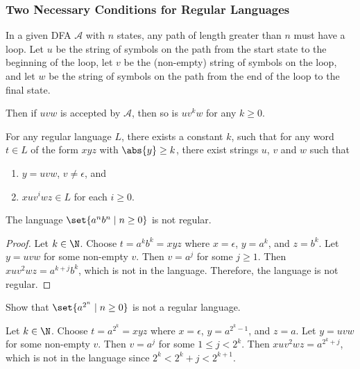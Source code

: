 
\subsubsection{Two Necessary Conditions for Regular Languages} \label{sec:pumping_periodic}
In a given DFA $\mathcal{A}$ with $n$ states, any path of length greater
than $n$ must have a loop.
Let $u$ be the string of symbols on the path from the start state to the
beginning of the loop, let $v$ be the (non-empty) string of symbols on the
loop, and let $w$ be the string of symbols on the path from the end of the
loop to the final state.

Then if $uvw$ is accepted by $\mathcal{A}$, then so is $uv^kw$ for any
$k \geq 0$.

\begin{theorem}
    For any regular language $L$, there exists a constant $k$, such that
    for any word $t \in L$ of the form $xyz$ with $\abs{y} \ge k$, there
    exist strings $u$, $v$ and $w$ such that
    \begin{enumerate}
        \item $y = uvw$, $v \ne \epsilon$, and
        \item $xu v^i wz \in L$ for each $i \ge 0$.
    \end{enumerate}
\end{theorem}

\begin{proposition}
    The language $\set{a^n b^n \mid n \ge 0}$ is not regular.
\end{proposition}
\begin{proof}
    Let $k \in \N$.
    Choose $t = a^k b^k = xyz$ where $x = \epsilon$, $y = a^k$, and $z = b^k$.
    Let $y = uvw$ for some non-empty $v$.
    Then $v = a^j$ for some $j \ge 1$.
    Then $x u v^2 w z = a^{k + j} b^k$, which is not in the language.
    Therefore, the language is not regular.
\end{proof}

\begin{problem}
    Show that $\set{a^{2^n} \mid n \ge 0}$ is not a regular language.
\end{problem}
\begin{solution}
    Let $k \in \N$.
    Choose $t = a^{2^k} = xyz$ where $x = \epsilon$, $y = a^{2^k - 1}$, and
    $z = a$.
    Let $y = uvw$ for some non-empty $v$.
    Then $v = a^j$ for some $1 \le j < 2^k$.
    Then $x u v^2 w z = a^{2^k + j}$, which is not in the language
    since $2^k < 2^k + j < 2^{k + 1}$.
\end{solution}

